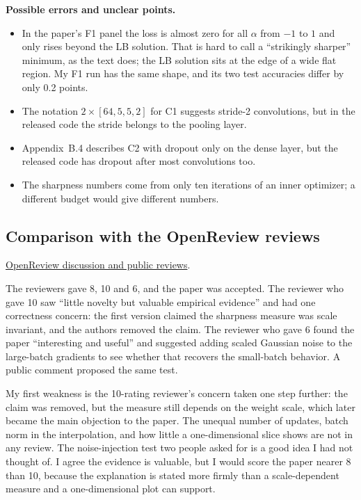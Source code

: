 \textbf{Possible errors and unclear points.}
\begin{itemize}
  \item In the paper's F1 panel the loss is almost zero for all $\alpha$ from $-1$ to $1$ and only rises beyond the LB solution. That is hard to call a ``strikingly sharper'' minimum, as the text does; the LB solution sits at the edge of a wide flat region. My F1 run has the same shape, and its two test accuracies differ by only 0.2 points.
  \item The notation $2\times[64,5,5,2]$ for C1 suggests stride-2 convolutions, but in the released code the stride belongs to the pooling layer.
  \item Appendix~B.4 describes C2 with dropout only on the dense layer, but the released code has dropout after most convolutions too.
  \item The sharpness numbers come from only ten iterations of an inner optimizer; a different budget would give different numbers.
\end{itemize}

\subsection{Comparison with the OpenReview reviews}
\noindent\href{https://openreview.net/forum?id=H1oyRlYgg}{OpenReview discussion and public reviews}.

The reviewers gave 8, 10 and 6, and the paper was accepted. The reviewer who gave 10 saw ``little novelty but valuable empirical evidence'' and had one correctness concern: the first version claimed the sharpness measure was scale invariant, and the authors removed the claim. The reviewer who gave 6 found the paper ``interesting and useful'' and suggested adding scaled Gaussian noise to the large-batch gradients to see whether that recovers the small-batch behavior. A public comment proposed the same test.

My first weakness is the 10-rating reviewer's concern taken one step further: the claim was removed, but the measure still depends on the weight scale, which later became the main objection to the paper. The unequal number of updates, batch norm in the interpolation, and how little a one-dimensional slice shows are not in any review. The noise-injection test two people asked for is a good idea I had not thought of. I agree the evidence is valuable, but I would score the paper nearer 8 than 10, because the explanation is stated more firmly than a scale-dependent measure and a one-dimensional plot can support.



